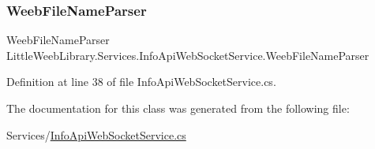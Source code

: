 \subsubsection{\texorpdfstring{Weeb\+File\+Name\+Parser}{WeebFileNameParser}}
{\footnotesize\ttfamily Weeb\+File\+Name\+Parser Little\+Weeb\+Library.\+Services.\+Info\+Api\+Web\+Socket\+Service.\+Weeb\+File\+Name\+Parser\hspace{0.3cm}{\ttfamily [private]}}



Definition at line 38 of file Info\+Api\+Web\+Socket\+Service.\+cs.



The documentation for this class was generated from the following file\+:\begin{DoxyCompactItemize}
\item 
Services/\mbox{\hyperlink{_info_api_web_socket_service_8cs}{Info\+Api\+Web\+Socket\+Service.\+cs}}\end{DoxyCompactItemize}
